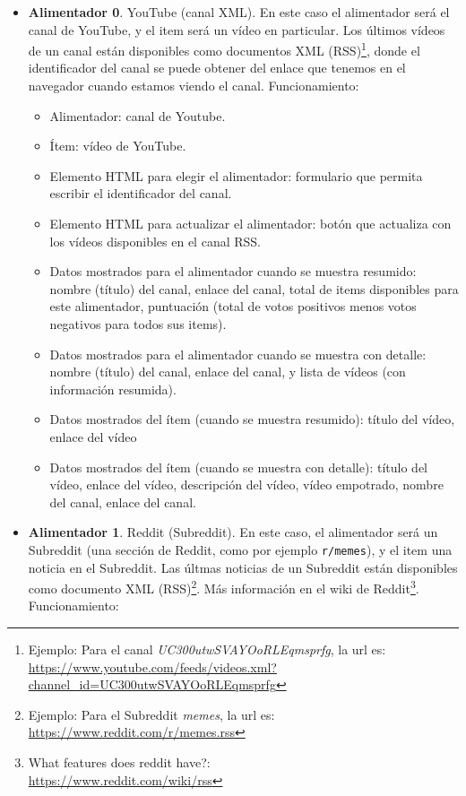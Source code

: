 \begin{itemize}
\item \textbf{Alimentador 0}. YouTube (canal XML). En este caso el alimentador será el canal de YouTube, y el item será un vídeo en particular. Los últimos vídeos de un canal están disponibles como documentos XML (RSS)\footnote{Ejemplo: Para el canal \emph{UC300utwSVAYOoRLEqmsprfg}, la url es:\\ \url{https://www.youtube.com/feeds/videos.xml?channel_id=UC300utwSVAYOoRLEqmsprfg}}, donde el identificador del canal se puede obtener del enlace que tenemos en el navegador cuando estamos viendo el canal. Funcionamiento:
  
  \begin{itemize}
  \item Alimentador: canal de Youtube.
  \item Ítem: vídeo de YouTube.
  \item Elemento HTML para elegir el alimentador: formulario que permita escribir el identificador del canal.
  \item Elemento HTML para actualizar el alimentador: botón que actualiza con los vídeos disponibles en el canal RSS.
  \item Datos mostrados para el alimentador cuando se muestra resumido: nombre (título) del canal, enlace del canal, total de items disponibles para este alimentador, puntuación (total de votos positivos menos votos negativos para todos sus items).
  \item Datos mostrados para el alimentador cuando se muestra con detalle: nombre (título) del canal, enlace del canal, y lista de vídeos (con información resumida).
  \item Datos mostrados del ítem (cuando se muestra resumido): título del vídeo, enlace del vídeo
  \item Datos mostrados del ítem (cuando se muestra con detalle): título del vídeo, enlace del vídeo, descripción del vídeo, vídeo empotrado, nombre del canal, enlace del canal.
  \end{itemize}

\item \textbf{Alimentador 1}. Reddit (Subreddit). En este caso, el alimentador será un Subreddit (una sección de Reddit, como por ejemplo \verb|r/memes|), y el item una noticia en el Subreddit. Las últmas noticias de un Subreddit están disponibles como documento XML (RSS)\footnote{Ejemplo: Para el Subreddit \emph{memes}, la url es:\\ \url{https://www.reddit.com/r/memes.rss}}. Más información en el wiki de Reddit\footnote{What features does reddit have?: \\ \url{https://www.reddit.com/wiki/rss}}. Funcionamiento:


\end{itemize}
